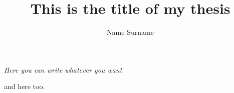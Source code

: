 \documentclass{styles/tthesis}
\title{This is the title of my thesis}
\author{Name Surname}
\begin{document}


\printfrontpage




\chapter*{\mbox{}}

\begin{flushright}
\thispagestyle{empty}
\null{}
{\it Here you can write whatever you want

\vspace{10pt}
and here too.
}
\null
\end{flushright}
%
\thispagestyle{empty}
\mbox{}
\newpage





\tableofcontents
\listoffigures
\listoftables

\mainmatter











\label{Bibliography}


\end{document}
